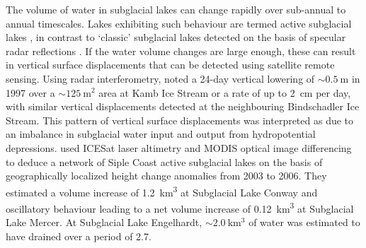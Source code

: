 The volume of water in subglacial lakes can change rapidly over sub-annual to annual timescales.
Lakes exhibiting such behaviour are termed active subglacial lakes \citep{Smithinventoryactivesubglacial2009}, in contrast to `classic' subglacial lakes detected on the basis of specular radar reflections \citep{CarterRadarbasedsubglaciallake2007}.
If the water volume changes are large enough, these can result in vertical surface displacements that can be detected using satellite remote sensing.
Using radar interferometry, \citet{GrayEvidencesubglacialwater2005} noted a 24-day vertical lowering of $\sim\SI{0.5}{\metre}$ in 1997 over a $\sim\SI{125}{\metre\squared}$ area at Kamb Ice Stream or a rate of up to \SI{2}{\centi\metre} per day, with similar vertical displacements detected at the neighbouring Bindschadler Ice Stream.
This pattern of vertical surface displacements was interpreted as due to an imbalance in subglacial water input and output from hydropotential depressions.
\citet{FrickerActiveSubglacialWater2007} used ICESat laser altimetry and MODIS optical image differencing to deduce a network of Siple Coast active subglacial lakes on the basis of geographically localized height change anomalies from 2003 to 2006.
They estimated a volume increase of \SI{1.2}{\kilo\metre\cubed} at Subglacial Lake Conway and oscillatory behaviour leading to a net volume increase of \SI{0.12}{\kilo\metre\cubed} at Subglacial Lake Mercer.
At Subglacial Lake Engelhardt, $\sim\SI{2.0}{\kilo\metre\cubed}$ of water was estimated to have drained over a period of \SI{2.7}{\year}.

